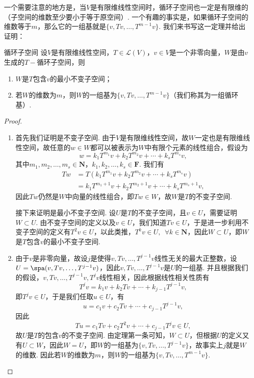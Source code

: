 一个需要注意的地方是，当$V$是有限维线性空间时，循环子空间也一定是有限维的（子空间的维数至少要小于等于原空间）. 一个有趣的事实是，如果循环子空间的维数等于$m$，那么它的一组基就是$\{v,Tv,\ldots,T^{m-1}v\}$. 我们来书写这一定理并给出证明：
\begin{theorem}{}{循环子空间}
    设$V$是有限维线性空间，$T\in\mathcal{L}(V)$，$v\in V$是一个非零向量，$W$是由$v$生成的$T-\text{循环子空间}$，则
    \begin{enumerate}
        \item $W$是$T$包含$v$的最小不变子空间；
        \item 若$W$的维数为$m$，则$W$的一组基为$\{v,Tv,\ldots,T^{m-1}v\}$（我们称其为一组循环基）.
    \end{enumerate}
\end{theorem}
\begin{proof}
    \begin{enumerate}
        \item 首先我们证明是不变子空间. 由于$V$是有限维线性空间，故$W$一定也是有限维线性空间，故任意的$w\in W$都可以被表示为$W$中有限个元素的线性组合，假设为
              \[w=k_1T^{m_1}v+k_2T^{m_2}v+\cdots+k_sT^{m_s}v,\]
              其中$m_1,m_2,\ldots,m_s\in\mathbf{N}$，$k_1,k_2,\ldots,k_s\in\mathbf{F}$. 我们有
              \[\begin{aligned}
                      Tw & =T(k_1T^{m_1}v+k_2T^{m_2}v+\cdots+k_sT^{m_s}v)     \\
                         & =k_1T^{m_1+1}v+k_2T^{m_2+1}v+\cdots+k_sT^{m_s+1}v,
                  \end{aligned}\]
              因此$Tw$仍然是$W$中向量的线性组合，即$Tw\in W$，故$W$是$T$的不变子空间.

              接下来证明是最小不变子空间. 设$U$是$T$的不变子空间，且$v\in U$，需要证明$W\subset U$. 由不变子空间的定义以及$v\in U$，我们知道$Tv\in U$，于是进一步利用不变子空间的定义有$T^2v\in U$，以此类推，$T^kv\in U,\enspace\forall k\in\mathbf{N}$，因此$W\subset U$，即$W$是$T$包含$v$的最小不变子空间.

        \item 由于$v$是非零向量，故设$j$是使得$v,Tv,\ldots,T^{j-1}v$线性无关的最大正整数，设$U=\spa(v,Tv,\ldots,T^{j-1}v)$，因此$v,Tv,\ldots,T^{j-1}v$是$U$的一组基. 并且根据我们的假设，$v,Tv,\ldots,T^{j-1}v,T^jv$线性相关，因此根据线性相关性质有
              \[T^jv=k_1v+k_2Tv+\cdots+k_{j-1}T^{j-1}v,\]
              即$T^jv\in U$，于是我们任取$u\in U$，有
              \[u=c_1v+c_2Tv+\cdots+c_{j-1}T^{j-1}v,\]
              因此
              \[Tu=c_1Tv+c_2T^2v+\cdots+c_{j-1}T^jv\in U,\]
              故$U$是$T$的包含$v$的不变子空间. 由定理第一条可知，$W\subset U$，但根据$U$的定义又有$U\subset W$，因此$W=U$，即$W$的一组基为$\{v,Tv,\ldots,T^{j-1}v\}$，故事实上$j$就是$W$的维数. 因此若$W$的维数为$m$，则$W$的一组基为$\{v,Tv,\ldots,T^{m-1}v\}$.
    \end{enumerate}
\end{proof}

